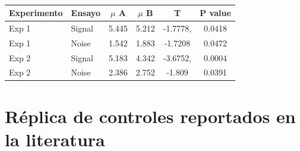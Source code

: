\begin{table}
\caption[Prueba T para evaluar diferencias en las medias de los puntajes de confianza asigandos entre condiciones]{}
\label{Tabla_t-HitsyFA}
\centering
\begin{tabular}{l l |  c c c c}
\toprule
\textbf{Experimento} & \textbf{Ensayo} & \textbf{$\mu$ A} & \textbf{$\mu$ B} & \textbf{T} & \textbf{P value}\\
\midrule
Exp 1 & Signal & 5.445 & 5.212 & -1.7778, & 0.0418 \\
Exp 1 & Noise & 1.542 & 1.883 & -1.7208 & 0.0472 \\
Exp 2 & Signal & 5.183 & 4.342  & -3.6752, & 0.0004 \\
Exp 2 & Noise & 2.386 & 2.752 & -1.809 & 0.0391 \\
\bottomrule
\end{tabular}
\end{table}












\section{Réplica de controles reportados en la literatura}



